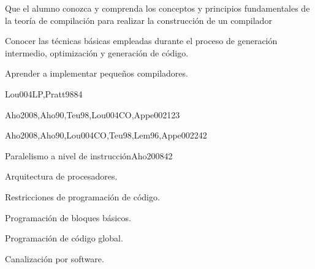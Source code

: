\begin{syllabus}


\begin{justification}
Que el alumno conozca y comprenda los conceptos y principios
fundamentales de la teoría de compilación para realizar la
construcción de un compilador
\end{justification}

\begin{goals}
\item Conocer las técnicas básicas empleadas durante el proceso de generación intermedio, optimización y generación de código.
\item Aprender a implementar pequeños compiladores.
\end{goals}

\begin{outcomes}
\end{outcomes}

\begin{unit}{\PLOverviewDef}{Lou004LP,Pratt98}{8}{4}
   \PLOverviewAllTopics
   \PLOverviewAllObjectives
\end{unit}

\begin{unit}{\PLBasicLanguageTranslationDef}{Aho2008,Aho90,Teu98,Lou004CO,Appe002}{12}{3}
   \PLBasicLanguageTranslationAllTopics
   \PLBasicLanguageTranslationAllObjectives
\end{unit}

\begin{unit}{\PLLanguageTranslatioSystemsDef}{Aho2008,Aho90,Lou004CO,Teu98,Lem96,Appe002}{24}{2}
   \PLLanguageTranslatioSystemsAllTopics
   \PLLanguageTranslatioSystemsAllObjectives
\end{unit}

\begin{unit}{Paralelismo a nivel de instrucción}{Aho2008}{4}{2}
  \begin{topics}
     \item Arquitectura de procesadores.
     \item Restricciones de programación de código.
     \item Programación de bloques básicos.
     \item Programación de código global.
     \item Canalización por software.
  \end{topics}


\end{unit}
\end{syllabus}
